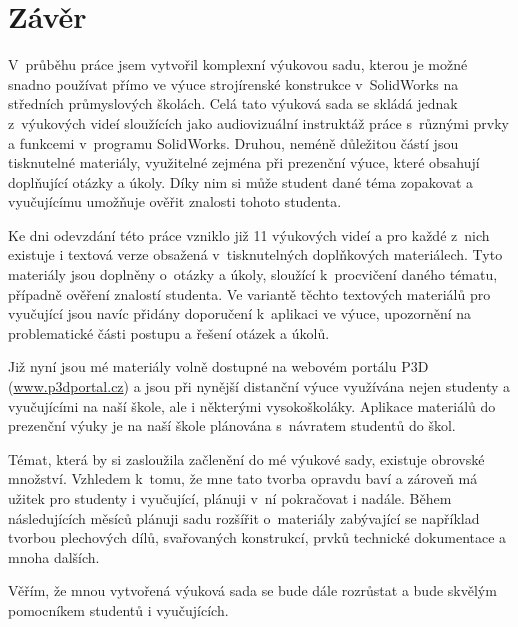 \chapter*{Závěr}
V~průběhu práce jsem vytvořil komplexní výukovou sadu, kterou je možné snadno používat přímo ve výuce strojírenské konstrukce v~SolidWorks na středních průmyslových školách.
Celá tato výuková sada se skládá jednak z~výukových videí sloužících jako audiovizuální instruktáž práce s~různými prvky a funkcemi v~programu SolidWorks.
Druhou, neméně důležitou částí jsou tisknutelné materiály, využitelné zejména při prezenční výuce, které obsahují doplňující otázky a úkoly.
Díky nim si může student dané téma zopakovat a vyučujícímu umožňuje ověřit znalosti tohoto studenta. 

Ke dni odevzdání této práce vzniklo již 11 výukových videí a pro každé z~nich existuje i textová verze obsažená v~tisknutelných doplňkových materiálech.
Tyto materiály jsou doplněny o~otázky a úkoly, sloužící k~procvičení daného tématu, případně ověření znalostí studenta.
Ve variantě těchto textových materiálů pro vyučující jsou navíc přidány doporučení k~aplikaci ve výuce, upozornění na problematické části postupu a řešení otázek a úkolů.

Již nyní jsou mé materiály volně dostupné na webovém portálu P3D (\href{https://www.p3dportal.cz}{www.p3dportal.cz}) a jsou při nynější distanční výuce využívána nejen studenty a vyučujícími na naší škole, ale i některými vysokoškoláky.
Aplikace materiálů do prezenční výuky je na naší škole plánována s~návratem studentů do škol.

Témat, která by si zasloužila začlenění do mé výukové sady, existuje obrovské množství.
Vzhledem k~tomu, že mne tato tvorba opravdu baví a zároveň má užitek pro studenty i vyučující, plánuji v~ní pokračovat i nadále.
Během následujících měsíců plánuji sadu rozšířit o~materiály zabývající se například tvorbou plechových dílů, svařovaných konstrukcí, prvků technické dokumentace a mnoha dalších.

Věřím, že mnou vytvořená výuková sada se bude dále rozrůstat a bude skvělým pomocníkem studentů i vyučujících.
\newpage